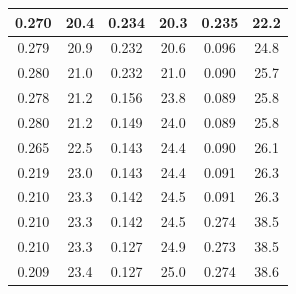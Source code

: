 \begin{table}[]
\begin{tabular}{|cccccc}
\multicolumn{1}{|c|}{0.270}   & \multicolumn{1}{c|}{20.4}     & \multicolumn{1}{c|}{0.234}     & \multicolumn{1}{c|}{20.3}     & \multicolumn{1}{c|}{0.235}     & \multicolumn{1}{c|}{22.2}     \\ \hline
\multicolumn{1}{|c|}{0.279}   & \multicolumn{1}{c|}{20.9}     & \multicolumn{1}{c|}{0.232}     & \multicolumn{1}{c|}{20.6}     & \multicolumn{1}{c|}{0.096}     & \multicolumn{1}{c|}{24.8}     \\ \hline
\multicolumn{1}{|c|}{0.280}   & \multicolumn{1}{c|}{21.0}     & \multicolumn{1}{c|}{0.232}     & \multicolumn{1}{c|}{21.0}     & \multicolumn{1}{c|}{0.090}     & \multicolumn{1}{c|}{25.7}     \\ \hline
\multicolumn{1}{|c|}{0.278}   & \multicolumn{1}{c|}{21.2}     & \multicolumn{1}{c|}{0.156}     & \multicolumn{1}{c|}{23.8}     & \multicolumn{1}{c|}{0.089}     & \multicolumn{1}{c|}{25.8}     \\ \hline
\multicolumn{1}{|c|}{0.280}   & \multicolumn{1}{c|}{21.2}     & \multicolumn{1}{c|}{0.149}     & \multicolumn{1}{c|}{24.0}     & \multicolumn{1}{c|}{0.089}     & \multicolumn{1}{c|}{25.8}     \\ \hline
\multicolumn{1}{|c|}{0.265}   & \multicolumn{1}{c|}{22.5}     & \multicolumn{1}{c|}{0.143}     & \multicolumn{1}{c|}{24.4}     & \multicolumn{1}{c|}{0.090}     & \multicolumn{1}{c|}{26.1}     \\ \hline
\multicolumn{1}{|c|}{0.219}   & \multicolumn{1}{c|}{23.0}     & \multicolumn{1}{c|}{0.143}     & \multicolumn{1}{c|}{24.4}     & \multicolumn{1}{c|}{0.091}     & \multicolumn{1}{c|}{26.3}     \\ \hline
\multicolumn{1}{|c|}{0.210}   & \multicolumn{1}{c|}{23.3}     & \multicolumn{1}{c|}{0.142}     & \multicolumn{1}{c|}{24.5}     & \multicolumn{1}{c|}{0.091}     & \multicolumn{1}{c|}{26.3}     \\ \hline
\multicolumn{1}{|c|}{0.210}   & \multicolumn{1}{c|}{23.3}     & \multicolumn{1}{c|}{0.142}     & \multicolumn{1}{c|}{24.5}     & \multicolumn{1}{c|}{0.274}     & \multicolumn{1}{c|}{38.5}     \\ \hline
\multicolumn{1}{|c|}{0.210}   & \multicolumn{1}{c|}{23.3}     & \multicolumn{1}{c|}{0.127}     & \multicolumn{1}{c|}{24.9}     & \multicolumn{1}{c|}{0.273}     & \multicolumn{1}{c|}{38.5}     \\ \hline
\multicolumn{1}{|c|}{0.209}   & \multicolumn{1}{c|}{23.4}     & \multicolumn{1}{c|}{0.127}     & \multicolumn{1}{c|}{25.0}     & \multicolumn{1}{c|}{0.274}     & \multicolumn{1}{c|}{38.6}     \\ \hline

\end{tabular}
\end{table}
